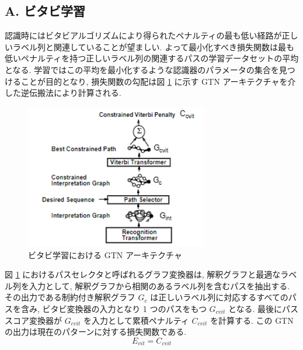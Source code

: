 \documentclass[twocolumn]{jarticle}     %
\begin{document}
\subsection*{A. ビタビ学習}
認識時にはビタビアルゴリズムにより得られたペナルティの最も低い経路が正しいラベル列と関連していることが望ましい. よって最小化すべき損失関数は最も低いペナルティを持つ正しいラベル列の関連するパスの学習データセットの平均となる. 学習ではこの平均を最小化するような認識器のパラメータの集合を見つけることが目的となり, 損失関数の勾配は図 \ref{fig:19} に示す GTN アーキテクチャを介した逆伝搬法により計算される. 
\begin{figure}[t]
  \centering
  \includegraphics[width=80mm]{assets/19.png}
  \caption{ビタビ学習における GTN アーキテクチャ}
  \label{fig:19}
\end{figure}
図 \ref{fig:19} におけるパスセレクタと呼ばれるグラフ変換器は, 解釈グラフと最適なラベル列を入力として, 解釈グラフから相関のあるラベル列を含むパスを抽出する. 
その出力である制約付き解釈グラフ $G_c$ は正しいラベル列に対応するすべてのパスを含み, ビタビ変換器の入力となり 1 つのパスをもつ $G_{cvit}$ となる.
最後にパススコア変換器が $G_{cvit}$ を入力として累積ペナルティ $C_{cvit}$ を計算する. この GTN の出力は現在のパターンに対する損失関数である.
\begin{equation}
  E_{vit} = C_{cvit}
\end{equation}
\end{document}

